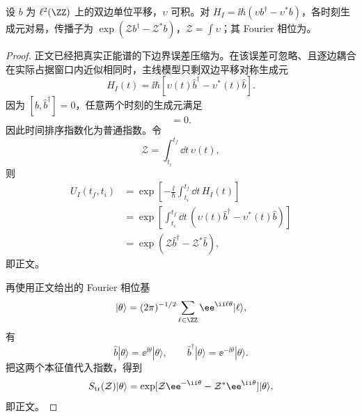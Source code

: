 \begin{proposition}[可交换双边平移生成元的精确传播]
设 $b$ 为 $\ell^2(\ZZ)$ 上的双边单位平移，$\upsilon$ 可积。对 $H_I=\ii\hbar(\upsilon b^\dagger-\upsilon^*b)$，各时刻生成元对易，传播子为 $\exp(\mathcal Zb^\dagger-\mathcal Z^*b)$，$\mathcal Z=\int\upsilon$；其 Fourier 相位为。
\end{proposition}
\begin{proof}
正文已经把真实正能谱的下边界误差压缩为。在该误差可忽略、且逐边耦合在实际占据窗口内近似相同时，主线模型只剩双边平移对称生成元
\begin{equation*}
H_I(t)=\ii\hbar[\upsilon(t)\hat b^\dagger-\upsilon^*(t)\hat b].
\end{equation*}
因为 $[\hat b,\hat b^\dagger]=0$，任意两个时刻的生成元满足
\begin{equation*}
[H_I(t),H_I(t')]=0.
\end{equation*}
因此时间排序指数化为普通指数。令
\begin{equation*}
\mathcal Z=\int_{t_i}^{t_f}\dd t\,\upsilon(t),
\end{equation*}
则
\begin{align*}
U_I(t_f,t_i)
&=\exp\!\left[-\frac{\ii}{\hbar}\int_{t_i}^{t_f}\dd t\,H_I(t)\right]\\
&=\exp\!\left[\int_{t_i}^{t_f}\dd t\,
(\upsilon(t)\hat b^\dagger-\upsilon^*(t)\hat b)\right]\\
&=\exp\!\left(\mathcal Z\hat b^\dagger-\mathcal Z^*\hat b\right),
\end{align*}
即正文。

再使用正文给出的 Fourier 相位基
\begin{equation*}
|\theta\rangle=(2\pi)^{-1/2}\sum_{\ell\in\ZZ}
 \ee^{\ii\ell\theta}|\ell\rangle,
\end{equation*}
有
\begin{equation*}
\hat b|\theta\rangle=\ee^{\ii\theta}|\theta\rangle,
\qquad
\hat b^\dagger|\theta\rangle=\ee^{-\ii\theta}|\theta\rangle.
\end{equation*}
把这两个本征值代入指数，得到
\begin{equation*}
S_{\rm tr}(\mathcal Z)|\theta\rangle
=\exp[\mathcal Z \ee^{-\ii\theta}-\mathcal Z^*\ee^{\ii\theta}]|\theta\rangle,
\end{equation*}
即正文。
\end{proof}


